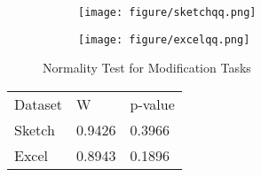 \begin{figure}[H]
		\centering
		\begin{subfigure}[b]{\textwidth}
			\texttt{[image: figure/sketchqq.png]}
		\end{subfigure}
		\begin{subfigure}[b]{\textwidth}
			\texttt{[image: figure/excelqq.png]}
		\end{subfigure}
		\caption{Normality Test for Modification Tasks}
	\end{figure}


\begin{tabular}{l l l}
Dataset & W & p-value \\
Sketch & 0.9426 & 0.3966 \\
Excel & 0.8943 & 0.1896 \\
\end{tabular}